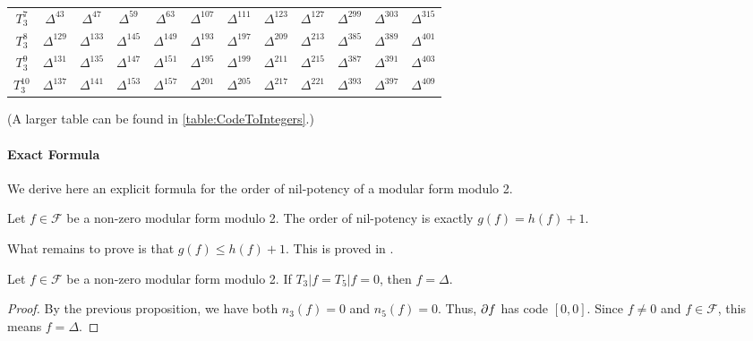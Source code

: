 \begin{center}
\begin{tabular}{|c||ccccccccccc|}
		$T_3^{7}$ & $\Delta^{43}$ & $\Delta^{47}$ & $\Delta^{59}$ & $\Delta^{63}$ & $\Delta^{107}$ & $\Delta^{111}$ & $\Delta^{123}$ & $\Delta^{127}$ & $\Delta^{299}$ & $\Delta^{303}$ & $\Delta^{315}$ \\
		$T_3^{8}$ & $\Delta^{129}$ & $\Delta^{133}$ & $\Delta^{145}$ & $\Delta^{149}$ & $\Delta^{193}$ & $\Delta^{197}$ & $\Delta^{209}$ & $\Delta^{213}$ & $\Delta^{385}$ & $\Delta^{389}$ & $\Delta^{401}$ \\
		$T_3^{9}$ & $\Delta^{131}$ & $\Delta^{135}$ & $\Delta^{147}$ & $\Delta^{151}$ & $\Delta^{195}$ & $\Delta^{199}$ & $\Delta^{211}$ & $\Delta^{215}$ & $\Delta^{387}$ & $\Delta^{391}$ & $\Delta^{403}$ \\
		$T_3^{10}$ & $\Delta^{137}$ & $\Delta^{141}$ & $\Delta^{153}$ & $\Delta^{157}$ & $\Delta^{201}$ & $\Delta^{205}$ & $\Delta^{217}$ & $\Delta^{221}$ & $\Delta^{393}$ & $\Delta^{397}$ & $\Delta^{409}$ \\
		\hline
	\end{tabular}

	(A larger table can be found in \ref{table:CodeToIntegers}.)
\end{center}




\paragraph{Exact Formula}
We derive here an explicit formula for the order of nil-potency of a modular form modulo 2.
\begin{theorem}
	Let $f \in \mathcal{F}$ be a non-zero modular form modulo 2.
	The order of nil-potency is exactly $g(f) = h(f) + 1$.
\end{theorem}
What remains to prove is that $g(f) \leq h(f) +1$.
This is proved in \cite[§5]{OrdreNilpotenceOperateurHecke}.

\begin{corollary}
	Let $f \in \mathcal{F}$ be a non-zero modular form modulo 2.
	If $T_3|f = T_5|f = 0$, then $f = \Delta$.
\end{corollary}
\begin{proof}
	By the previous proposition, we have both $n_3(f)=0$ and $n_5(f)=0$.
	Thus, $\partial f$ has code $\left[ 0,0 \right]$.
	Since $f \neq 0$ and $f \in \mathcal{F}$, this means $f = \Delta$.
\end{proof}





